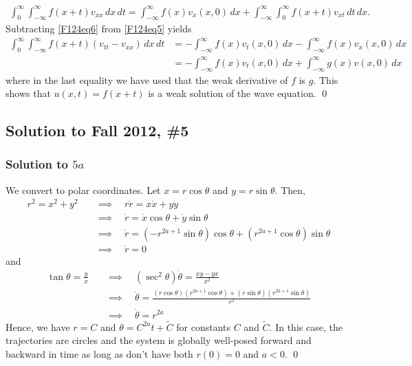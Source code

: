 \begin{align}\label{F124eq6}
\int_{0}^{\infty}\int_{-\infty}^{\infty}f(x + t)v_{xx}\, dx\, dt = \int_{-\infty}^{\infty}f(x)v_{x}(x, 0)\, dx + \int_{-\infty}^{\infty}\int_{0}^{\infty}f(x + t)v_{xt}\, dt\, dx.
\end{align}
Subtracting \eqref{F124eq6} from \eqref{F124eq5} yields
\begin{align*}
\int_{0}^{\infty}\int_{-\infty}^{\infty}f(x + t)(v_{tt} - v_{xx})\, dx\, dt& = -\int_{-\infty}^{\infty}f(x)v_{t}(x, 0)\, dx - \int_{-\infty}^{\infty}f(x)v_{x}(x, 0)\, dx\\
& = -\int_{-\infty}^{\infty}f(x)v_{t}(x, 0)\, dx + \int_{-\infty}^{\infty}g(x)v(x, 0)\, dx
\end{align*}
where in the last equality we have used that the weak derivative of $f$ is $g$.
This shows that $u(x, t) = f(x + t)$ is a weak solution of the wave equation.
\hfill\qed

\subsection*{Solution to Fall 2012, \#5}
\label{F12Q5}

\subsubsection*{Solution to $5a$}

We convert to polar coordinates. Let $x = r\cos\theta$ and $y = r\sin \theta$. Then,
\begin{align*}
r^2 =x^2 + y^2 \quad &\implies \quad r\dot{r} = x\dot{x} + y \dot{y} \\
&\implies \quad \dot{r} = \dot{x} \cos \theta + \dot{y} \sin \theta \\
&\implies \quad \dot{r} = (-r^{2a+1} \sin \theta) \cos \theta + (r^{2a+1} \cos \theta) \sin \theta \\
&\implies \quad \dot{r} = 0
\end{align*}
and
\begin{align*}
\tan \theta = \frac{y}{x} \quad &\implies \quad (\sec^2 \theta) \dot{\theta} = \frac{x \dot{y} - y \dot{x}}{x^2} \\
&\implies \quad \dot{\theta} = \frac{(r \cos \theta)(r^{2a+1} \cos \theta)+(r \sin \theta)(r^{2a+1} \sin \theta)}{r^2} \\
&\implies \quad \dot{\theta} = r^{2a}
\end{align*}
Hence, we have $r = C$ and $\theta = C^{2a}t + \tilde{C}$ for constants $C$ and $\tilde{C}$. In this case, the trajectories are circles and the system is globally well-posed forward and backward in time as long as don't have both $r(0) = 0$ and $a < 0$. \hfill \qed

